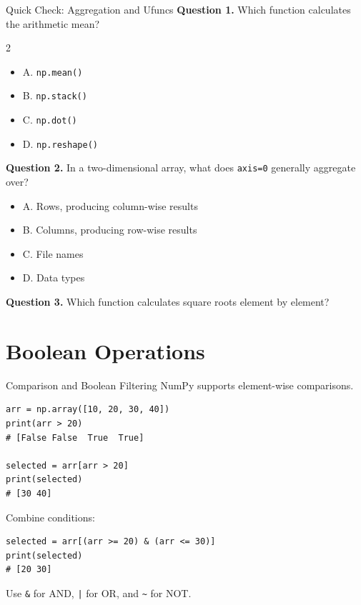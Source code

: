 \documentclass[aspectratio=169,11pt]{beamer}
\newcommand{\quiztitle}[1]{\textbf{\textcolor{QuizOrange}{#1}}}
\begin{document}
\begin{frame}{Quick Check: Aggregation and Ufuncs}
\small
\quiztitle{Question 1.} Which function calculates the arithmetic mean?
\begin{multicols}{2}
\begin{itemize}
  \item A. \texttt{np.mean()}
  \item B. \texttt{np.stack()}
  \item C. \texttt{np.dot()}
  \item D. \texttt{np.reshape()}
\end{itemize}
\end{multicols}
\quiztitle{Question 2.} In a two-dimensional array, what does \texttt{axis=0} generally aggregate over?
\begin{itemize}
  \item A. Rows, producing column-wise results
  \item B. Columns, producing row-wise results
  \item C. File names
  \item D. Data types
\end{itemize}
\quiztitle{Question 3.} Which function calculates square roots element by element?
\end{frame}

\section{Boolean Operations}

\begin{frame}[fragile]{Comparison and Boolean Filtering}
\small
NumPy supports element-wise comparisons.
\begin{lstlisting}[style=py]
arr = np.array([10, 20, 30, 40])
print(arr > 20)
# [False False  True  True]

selected = arr[arr > 20]
print(selected)
# [30 40]
\end{lstlisting}
Combine conditions:
\begin{lstlisting}[style=py]
selected = arr[(arr >= 20) & (arr <= 30)]
print(selected)
# [20 30]
\end{lstlisting}
Use \texttt{\&} for AND, \texttt{|} for OR, and \texttt{\textasciitilde} for NOT.
\end{frame}
\end{document}

